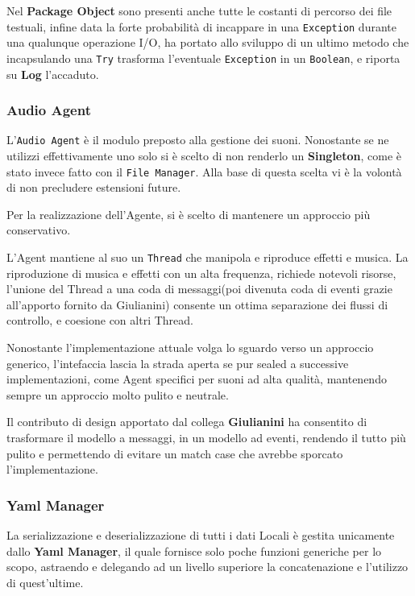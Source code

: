     Nel \textbf{Package Object} sono presenti anche tutte le costanti
    di percorso dei file testuali, infine data la forte probabilità di incappare in una \texttt{Exception} durante una qualunque operazione I/O, ha portato allo sviluppo di un ultimo metodo che incapsulando una \texttt{Try} trasforma l'eventuale  \texttt{Exception} in un \texttt{Boolean}, e riporta su \textbf{Log} l'accaduto.
    
    \subsubsection{Audio Agent}
    L'\texttt{Audio Agent} è il modulo preposto alla gestione dei suoni. Nonostante se ne utilizzi effettivamente uno solo si è scelto di non renderlo un \textbf{Singleton}, come è stato invece fatto con il \texttt{File Manager}. 
    Alla base di questa scelta vi è la volontà di non precludere estensioni future.
    
    Per la realizzazione dell'Agente, si è scelto di mantenere un approccio più conservativo. 
    
    L'Agent mantiene al suo un \texttt{Thread} che 
    manipola e riproduce effetti e musica.
    La riproduzione di musica e effetti con un alta frequenza, richiede notevoli risorse, l'unione del Thread a una coda di messaggi(poi divenuta coda di eventi grazie all'apporto fornito da Giulianini) consente un ottima separazione dei flussi di controllo, e coesione con altri Thread.
    
    Nonostante l'implementazione attuale volga lo sguardo verso un approccio generico, l'intefaccia lascia la strada aperta se pur sealed a successive implementazioni, come Agent specifici per suoni ad alta qualità, mantenendo sempre un approccio molto pulito e neutrale.
    
    Il contributo di design apportato dal collega \textbf{Giulianini} ha consentito di trasformare il modello a messaggi, in un modello ad eventi, rendendo il tutto più
    pulito e permettendo di evitare un match case
    che avrebbe sporcato l'implementazione.
    
    \subsubsection{Yaml Manager}
    La serializzazione e deserializzazione di tutti i dati \textbf{}{Locali} è gestita unicamente dallo \textbf{Yaml Manager}, il quale fornisce solo poche funzioni generiche 
    per lo scopo, astraendo e delegando ad un livello superiore 
    la concatenazione e l'utilizzo di quest'ultime.
    
